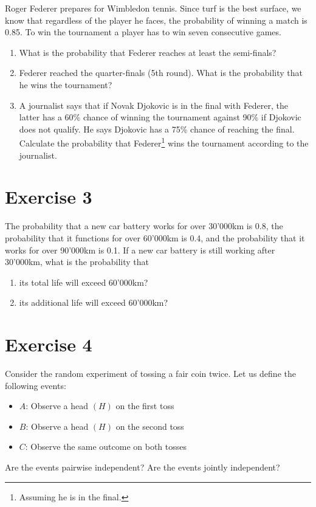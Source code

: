 \documentclass[12pt,thmsa]{article}
\begin{document}
Roger Federer prepares for Wimbledon tennis. Since turf is the best surface, we know that regardless of the player he faces, the probability of winning a match is 0.85. To win the tournament a player has to win seven consecutive games.

\begin{enumerate} %

\item What is the probability that Federer reaches at least the semi-finals?

\item Federer reached the quarter-finals (5th round). What is the probability that he wins the tournament?

\item A journalist says that if Novak Djokovic is in the final with Federer, the latter has a 60\% chance of winning the tournament against 90\% if Djokovic does not qualify.
 He says Djokovic has a 75\% chance of reaching the final. Calculate the probability that Federer\footnote{Assuming he is in the final.} wins the tournament according to the  journalist.

\end{enumerate}

\section*{Exercise 3}

The probability that a new car battery works for over  30'000km is
0.8, the probability that it functions for over 60'000km is 0.4, and the probability that it
works for over 90'000km is 0.1. If a new car battery is still working after 30'000km,
what is the probability that

\begin{enumerate}
\item  its total life will exceed 60'000km?
\item its additional life will exceed 60'000km?

\end{enumerate} 

 
\section*{Exercise 4}
Consider the random experiment of tossing a fair coin twice. Let us define the following events:
\begin{itemize}
\item $ A $: Observe a head $ (H) $ on the first toss
\item $ B $: Observe a head $ (H) $ on the second toss
\item $ C $: Observe the same outcome on both tosses
\end{itemize}
Are the events pairwise independent? Are the events jointly independent?
\end{document}

